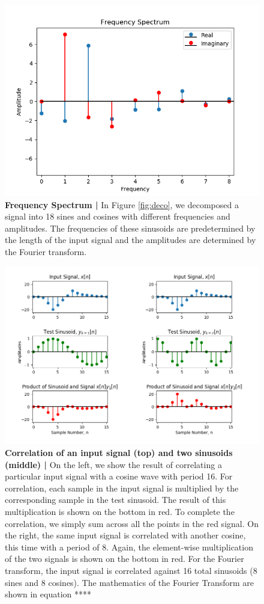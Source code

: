 \documentclass[12pt,a4paper]{article}
\begin{document}
\begin{figure}
\centering
\includegraphics[width=.85\textwidth]{_images/FreqSpec.png}
\caption{\textbf{Frequency Spectrum |} In Figure \ref{fig:deco}, we decomposed a signal into 18 sines and cosines with different frequencies and amplitudes. The frequencies of these sinusoids are predetermined by the length of the input signal and the amplitudes are determined by the Fourier transform. 
}
\end{figure}


\begin{figure}
\centering
\includegraphics[width=\textwidth]{_images/FourierCorrelation3-m56p3-47p1.png}
\caption{\textbf{Correlation of an input signal (top) and two sinusoids (middle) |} On the left, we show the result of correlating a particular input signal with a cosine wave with period 16. For correlation, each sample in the input signal is multiplied by the corresponding sample in the test sinusoid. The result of this multiplication is shown on the bottom in red. To complete the correlation, we simply sum across all the points in the red signal. On the right, the same input signal is correlated with another cosine, this time with a period of 8. Again, the element-wise multiplication of the two signals is shown on the bottom in red. For the Fourier transform, the input signal is correlated against 16 total sinusoids (8 sines and 8 cosines). The mathematics of the Fourier Transform are shown in equation ****}
\end{figure}
\end{document}
